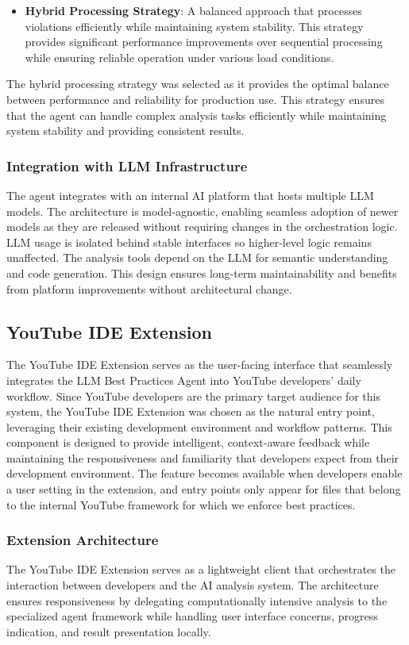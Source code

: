 \begin{spacing}{1.2}
\begin{itemize}
    \item \textbf{Hybrid Processing Strategy}: A balanced approach that processes violations efficiently while maintaining system stability. This strategy provides significant performance improvements over sequential processing while ensuring reliable operation under various load conditions.
\end{itemize}

The hybrid processing strategy was selected as it provides the optimal balance between performance and reliability for production use. This strategy ensures that the agent can handle complex analysis tasks efficiently while maintaining system stability and providing consistent results.

\subsubsection{Integration with LLM Infrastructure}
The agent integrates with an internal AI platform that hosts multiple LLM models. The architecture is model‑agnostic, enabling seamless adoption of newer models as they are released without requiring changes in the orchestration logic. LLM usage is isolated behind stable interfaces so higher‑level logic remains unaffected. The analysis tools depend on the LLM for semantic understanding and code generation. This design ensures long‑term maintainability and benefits from platform improvements without architectural change.

\subsection{YouTube IDE Extension}
The YouTube IDE Extension serves as the user-facing interface that seamlessly integrates the LLM Best Practices Agent into YouTube developers' daily workflow. Since YouTube developers are the primary target audience for this system, the YouTube IDE Extension was chosen as the natural entry point, leveraging their existing development environment and workflow patterns. This component is designed to provide intelligent, context-aware feedback while maintaining the responsiveness and familiarity that developers expect from their development environment. The feature becomes available when developers enable a user setting in the extension, and entry points only appear for files that belong to the internal YouTube framework for which we enforce best practices.

\subsubsection{Extension Architecture}
The YouTube IDE Extension serves as a lightweight client that orchestrates the interaction between developers and the AI analysis system. The architecture ensures responsiveness by delegating computationally intensive analysis to the specialized agent framework while handling user interface concerns, progress indication, and result presentation locally.


\end{spacing}
